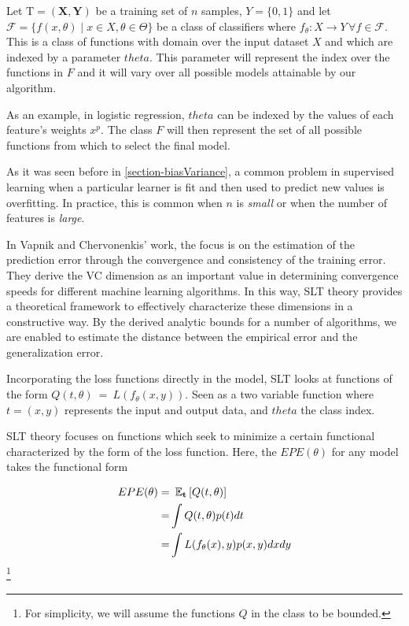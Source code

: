 Let $\mathrm{T} = (\textbf{X},\textbf{Y})$ be a training set of $n$ samples, $Y = \{0,1 \}$ and let $\mathcal {F} = \{f(x,\theta) \mid x \in X, \theta \in \Theta\}$ be a class of classifiers where $f_\theta: X \rightarrow Y \, \forall f \in \mathcal {F}$. This is a class of functions with domain over the input dataset $X$ and which are indexed by a parameter $theta$. This parameter will represent the index over the functions in $F$ and it will vary over all possible models attainable by our algorithm.

As an example, in logistic regression, $theta$ can be indexed by the values of each feature's weights $x^p$. The class $F$ will then represent the set of all possible functions from which to select the final model.

As it was seen before in \cref{section-biasVariance}, a common problem in supervised learning when a particular learner is fit and then used to predict new values is overfitting. In practice, this is common when $n$ is \textit{small} or when the number of features is \textit{large}.

In Vapnik and Chervonenkis' work, the focus is on the estimation of the prediction error through the convergence and consistency of the training error. They derive the VC dimension as an important value in determining convergence speeds for different machine learning algorithms. In this way, SLT theory provides a theoretical framework to effectively characterize these dimensions in a constructive way. By the derived analytic bounds for a number of algorithms, we are enabled to estimate the distance between the empirical error and the generalization error.

Incorporating the loss functions directly in the model, SLT looks at functions of the form $Q(t,\theta) \ = \ L(f_\theta(x,y))$. Seen as a two variable function where $t=(x,y)$ represents the input and output data, and $theta$ the class index.

SLT theory focuses on functions which seek to minimize a certain functional characterized by the form of the loss function. Here, the $EPE(\theta)$ for any model takes the functional form

\begin{equation}\label{vapnik-risk}
\begin{split}
EPE(\theta) = & \ \operatorname{\mathbb{E}}_{\textbf{t}} \left[ Q(t,\theta) \right]\\
= & \int Q(t,\theta) p(t) dt \\
= & \int L(f_\theta(x),y) p(x,y) dx dy
\end{split}
\end{equation}\footnote{For simplicity, we will assume the functions $Q$ in the class to be bounded.}

